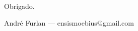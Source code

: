 \begin{frame}
	\centering
	\Huge Obrigado.
	\vspace{1cm}

	\normalsize André Furlan --- ensismoebius@gmail.com
\end{frame}
